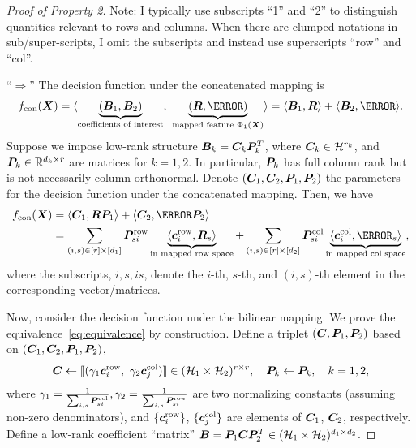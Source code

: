 \documentclass[11pt]{article}
\theoremstyle{plain}
\theoremstyle{definition}
\newcommand*{\KeepStyleUnderBrace}[1]{%
  \mathop{%
    \mathchoice
    {\underbrace{\displaystyle#1}}%
    {\underbrace{\textstyle#1}}%
    {\underbrace{\scriptstyle#1}}%
    {\underbrace{\scriptscriptstyle#1}}%
  }\limits
}
\begin{document}
\begin{proof}[Proof of Property 2]
Note: I typically use subscripts ``1'' and ``2'' to distinguish quantities relevant to rows and columns. When there are clumped notations in sub/super-scripts, I omit the subscripts and instead use superscripts ``row'' and ``col''.  

``$\Rightarrow$'' The decision function under the concatenated mapping is
\begin{align}
f_\text{con}(\mX)=\langle \KeepStyleUnderBrace{(\mB_1, \mB_2)}_{\text{coefficients of interest}},\ \KeepStyleUnderBrace{(\mR,\mL)}_{\text{mapped feature $\Phi_1(\mX)$}} \rangle  = \langle \mB_1, \mR \rangle +  \langle \mB_2, \mL \rangle.
\end{align}
Suppose we impose low-rank structure $\bm B_k=\bm C_k\bm{P}^T_k$, where $\bm C_k\in\mathcal{H}^{r_k}$, and $\bm{P}_k\in\mathbb{R}^{d_k\times r}$ are matrices for $k=1,2$. In particular, $\bm{P}_k$ has full column rank but is not necessarily column-orthonormal. Denote $(\bm C_1,\bm C_2, \bm{P}_1, \bm{P}_2)$ the parameters for the decision function under the concatenated mapping. Then, we have
\begin{align}\label{eq:con}
f_\text{con}(\mX)&=\langle \mC_1, \mR\mP_1 \rangle + \langle \mC_2, \mL\mP_2 \rangle\\
& = \sum_{(i,s)\in[r]\times [d_1]} \mP^{\text{row}}_{si}\KeepStyleUnderBrace{ \langle \mc^{\text{row}}_{i}, \mR_{s}\rangle}_{\text{in mapped row space}}+\sum_{(i,s)\in[r]\times [d_2]} \mP^{\text{col}}_{si} \KeepStyleUnderBrace{\langle \mc^{\text{col}}_{i}, \mL_{s}\rangle}_{\text{\text{in mapped col space}}},
\end{align}
where the subscripts, $i,s, is$, denote the $i$-th, $s$-th, and $(i,s)$-th element in the corresponding vector/matrices. 

Now, consider the decision function under the bilinear mapping. We prove the equivalence~\eqref{eq:equivalence} by construction. Define a triplet $( \bm C, \bm{P}_1, \bm{P}_2)$ based on $(\bm C_1,\bm C_2, \bm{P}_1, \bm{P}_2)$, 
\begin{equation}\label{eq:mapping}
\bm C\leftarrow \llbracket (\gamma_1\bm{c}^{\text{row}}_i,\ \gamma_2\bm{c}^{\text{col}}_j) \rrbracket\in (\mathcal{H}_1\times \mathcal{H}_2)^{r\times r}, \quad \bm{P}_k\leftarrow \bm{P}_k,\quad k=1,2,
\end{equation} 
where $\gamma_1={1\over \sum_{i,s}\bm{P}^{\text{col}}_{si}}, \gamma_2={1\over \sum_{i,s}\bm{P}^{\text{row}}_{si}}$ are two normalizing constants (assuming non-zero denominators), and $\{\bm{c}^{\text{row}}_i\}$, $\{\bm{c}^{\text{col}}_j\}$ are elements of $\bm C_1$, $\bm C_2$, respectively. Define a low-rank coefficient ``matrix'' $\bm B= \bm{P}_1\bm C \bm{P}^T_2 \in (\mathcal{H}_1\times \mathcal{H}_2)^{d_1\times d_2}$. 


\end{proof}
\end{document}
